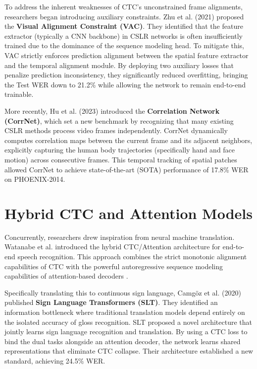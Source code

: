 To address the inherent weaknesses of CTC's unconstrained frame alignments, researchers began introducing auxiliary constraints. Zhu et al. (2021) \cite{zhu2021visual} proposed the \textbf{Visual Alignment Constraint (VAC)}. They identified that the feature extractor (typically a CNN backbone) in CSLR networks is often insufficiently trained due to the dominance of the sequence modeling head. To mitigate this, VAC strictly enforces prediction alignment between the spatial feature extractor and the temporal alignment module. By deploying two auxiliary losses that penalize prediction inconsistency, they significantly reduced overfitting, bringing the Test WER down to 21.2\% while allowing the network to remain end-to-end trainable.

More recently, Hu et al. (2023) \cite{hu2023continuous} introduced the \textbf{Correlation Network (CorrNet)}, which set a new benchmark by recognizing that many existing CSLR methods process video frames independently. CorrNet dynamically computes correlation maps between the current frame and its adjacent neighbors, explicitly capturing the human body trajectories (specifically hand and face motion) across consecutive frames. This temporal tracking of spatial patches allowed CorrNet to achieve state-of-the-art (SOTA) performance of 17.8\% WER on PHOENIX-2014.

\section{Hybrid CTC and Attention Models}

Concurrently, researchers drew inspiration from neural machine translation. Watanabe et al. \cite{watanabe2017hybrid} introduced the hybrid CTC/Attention architecture for end-to-end speech recognition. This approach combines the strict monotonic alignment capabilities of CTC with the powerful autoregressive sequence modeling capabilities of attention-based decoders \cite{vaswani2017attention}.

Specifically translating this to continuous sign language, Camgöz et al. (2020) \cite{camgoz2020sign} published \textbf{Sign Language Transformers (SLT)}. They identified an information bottleneck where traditional translation models depend entirely on the isolated accuracy of gloss recognition. SLT proposed a novel architecture that jointly learns sign language recognition and translation. By using a CTC loss to bind the dual tasks alongside an attention decoder, the network learns shared representations that eliminate CTC collapse. Their architecture established a new standard, achieving 24.5\% WER. 

